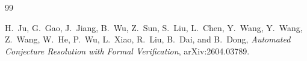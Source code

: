 \documentclass[11pt]{article}
\numberwithin{equation}{section}
\theoremstyle{plain}
\theoremstyle{definition}
\theoremstyle{remark}
\begin{document}
\clearpage
\begin{thebibliography}{99}

 H.~Ju, G.~Gao, J.~Jiang, B.~Wu, Z.~Sun, S.~Liu, L.~Chen, Y.~Wang, Y.~Wang, Z.~Wang, W.~He, P.~Wu, L.~Xiao, R.~Liu, B.~Dai, and B.~Dong, \textit{Automated Conjecture Resolution with Formal Verification}, arXiv:2604.03789.

\end{thebibliography}
\end{document}
